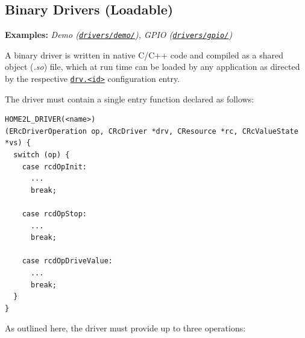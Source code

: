 \documentclass[12pt,english,parskip=half,headheight=19pt]{scrreprt}
\newcommand{\idx}[1]{#1\index{#1}}
\newcommand{\refenv}[1]{\hyperref[env:#1]{\texttt{#1}}}        %
\newcommand{\refsrc}[1]{\href{#1}{\texttt{#1}}}     %
\begin{document}
\subsection{Binary Drivers (Loadable)}
\label{sec:resources-drvdev-binary}

\textbf{Examples:} \textit{Demo (\refsrc{drivers/demo/}), GPIO (\refsrc{drivers/gpio/})}

A binary driver is written in native C/C++ code and compiled as a shared object (\textit{.so}) file, which at run time can be loaded by any application as directed by the respective \refenv{drv.<id>} configuration entry.

The driver must contain a single entry function declared as follows:
\begin{lstlisting}
HOME2L_DRIVER(<name>)
(ERcDriverOperation op, CRcDriver *drv, CResource *rc, CRcValueState *vs) {
  switch (op) {
    case rcdOpInit:
      ...
      break;

    case rcdOpStop:
      ...
      break;

    case rcdOpDriveValue:
      ...
      break;
  }
}
\end{lstlisting}

As outlined here, the driver must provide up to three operations:
\end{document}
